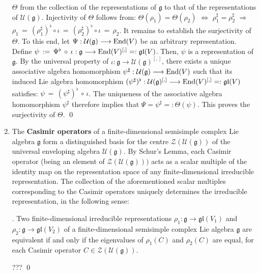 \begin{enumerate}
	$\Theta$ from the collection of the representations of $\mathfrak{g}$
	to that of the representations of $\mathcal{U}(\mathfrak{g})$.
	Injectivity of $\Theta$ follows from:
	$\Theta(\rho_{1}) = \Theta(\rho_{2})$
	$\Longleftrightarrow$
	$\rho_{1}^{\sharp} = \rho_{2}^{\sharp}$
	$\Longrightarrow$
	$\rho_{1} \,=\, (\rho_{1}^{\sharp})^{\flat} \circ \iota \,=\, (\rho_{2}^{\sharp})^{\flat} \circ \iota \,=\, \rho_{2}$.
	It remains to establish the surjectivity of $\Theta$.
	To this end, let $\Psi : \mathcal{U}(\mathfrak{g}) \longrightarrow \textnormal{End}(V)$ be an arbitrary representation.
	Define $\psi \, := \, \Psi^{\flat} \,\circ\, \iota : \mathfrak{g} \longrightarrow \textnormal{End}(V)^{[,]} =: \mathfrak{gl}(V)$.
	Then, $\psi$ is a representation of $\mathfrak{g}$.
	By the universal property of
	$\iota : \mathfrak{g} \longrightarrow \mathcal{U}(\mathfrak{g})^{[,]}$,
	there exists a unique associative algebra homomorphism
	$\psi^{\sharp} : \mathcal{U}(\mathfrak{g}) \longrightarrow \textnormal{End}(V)$
	such that its induced Lie algebra homomorphism
	$(\psi^{\sharp})^{\flat} : \mathcal{U}(\mathfrak{g})^{[,]} \longrightarrow \textnormal{End}(V)^{[,]} =: \mathfrak{gl}(V)$
	satisfies:
	$\psi \,=\, (\psi^{\sharp})^{\flat} \,\circ\, \iota$.
	The uniqueness of the associative algebra homomorphism $\psi^{\sharp}$ therefore implies that
	$\Psi = \psi^{\sharp} =: \Theta(\psi)$.
	This proves the surjectivity of $\Theta$.
	\qed
\item
	The \textbf{Casimir operators} of a finite-dimensional semisimple complex Lie algebra $\mathfrak{g}$
	form a distinguished basis for the centre $\mathcal{Z}(\mathcal{U}(\mathfrak{g}))$ of the universal enveloping algebra
	$\mathcal{U}(\mathfrak{g})$.
	\vskip 0.1cm
	By Schur's Lemma, each Casimir operator (being an element of $\mathcal{Z}(\mathcal{U}(\mathfrak{g})))$ acts
	as a scalar multiple of the identity map on the representation space of any finite-dimensional irreducible representation.
	\vskip 0.1cm
	The collection of the aforementioned scalar multiples corresponding to the Casimir operators uniquely determines
	the irreducible representation, in the following sense:
	\begin{theorem}
	{\color{white}.}\vskip -0.1cm
	\noindent Two finite-dimensional irreducible representations
	$\rho_{1} : \mathfrak{g} \longrightarrow \mathfrak{gl}(V_{1})$
	and
	$\rho_{2} : \mathfrak{g} \longrightarrow \mathfrak{gl}(V_{2})$	
	of a finite-dimensional semisimple complex Lie algebra $\mathfrak{g}$
	are equivalent if and only if the eigenvalues of $\rho_{1}(C)$ and $\rho_{2}(C)$ are equal,
	for each Casimir operator $C \in \mathcal{Z}(\mathcal{U}(\mathfrak{g}))$.
	\end{theorem}
	\proof ??? \qed
\end{enumerate}


